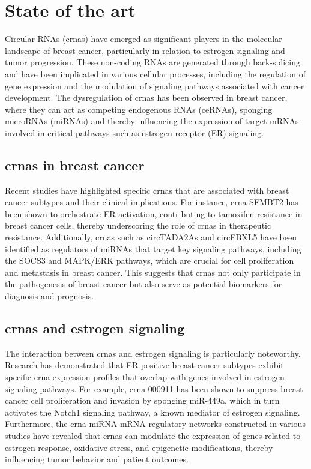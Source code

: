 \section{State of the art}
Circular RNAs (\gls{crna}s) have emerged as significant players in the
molecular landscape of breast cancer, particularly in relation to estrogen
signaling and tumor progression.
These non-coding RNAs are generated through back-splicing and have been
implicated in various cellular processes, including the regulation of gene
expression and the modulation of signaling pathways associated with cancer
development\supercite{li_circrna-sfmbt2_2023,tran_new_2020}.
The dysregulation of \gls{crna}s has been observed in breast cancer, where they
can act as competing endogenous RNAs (ceRNAs), sponging microRNAs (miRNAs) and
thereby influencing the expression of target mRNAs involved in critical
pathways such as estrogen receptor (ER)
signaling\supercite{nair_circular_2016,xu_circrna_2022}.

\subsection{\Gls{crna}s in breast cancer}
Recent studies have highlighted specific \gls{crna}s that are associated with
breast cancer subtypes and their clinical implications.
For instance, \gls{crna}-SFMBT2 has been shown to orchestrate ER\textalpha{}
activation, contributing to tamoxifen resistance in breast cancer cells,
thereby underscoring the role of \gls{crna}s in therapeutic
resistance\supercite{li_circrna-sfmbt2_2023}.
Additionally, \gls{crna}s such as circTADA2As and circFBXL5 have been
identified as regulators of miRNAs that target key signaling pathways,
including the SOCS3 and MAPK/ERK pathways, which are crucial for cell
proliferation and metastasis in breast
cancer\supercite{xu_circtada2as_2019,gao_hsa_circrna_0006528_2019}.
This suggests that \gls{crna}s not only participate in the pathogenesis of
breast cancer but also serve as potential biomarkers for diagnosis and
prognosis\supercite{liu_influence_2021,chen_circepsti1_2018}.

\subsection{\Gls{crna}s and estrogen signaling}
The interaction between \gls{crna}s and estrogen signaling is particularly
noteworthy.
Research has demonstrated that ER-positive breast cancer subtypes exhibit
specific \gls{crna} expression profiles that overlap with genes involved in
estrogen signaling pathways\supercite{nair_circular_2016}.
For example, \gls{crna}-000911 has been shown to suppress breast cancer cell
proliferation and invasion by sponging miR-449a, which in turn activates the
Notch1 signaling pathway, a known mediator of estrogen
signaling\supercite{wang_comprehensive_2018}.
Furthermore, the \gls{crna}-miRNA-mRNA regulatory networks constructed in
various studies have revealed that \gls{crna}s can modulate the expression of
genes related to estrogen response, oxidative stress, and epigenetic
modifications, thereby influencing tumor behavior and patient
outcomes\supercite{xu_circrna_2022,nair_circular_2016}.

